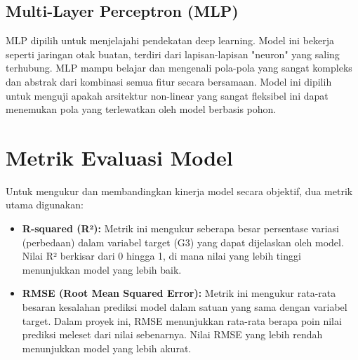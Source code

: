 \subsection{Multi-Layer Perceptron (MLP)}
MLP dipilih untuk menjelajahi pendekatan deep learning. Model ini bekerja seperti jaringan otak buatan, terdiri dari lapisan-lapisan "neuron" yang saling terhubung. MLP mampu belajar dan mengenali pola-pola yang sangat kompleks dan abstrak dari kombinasi semua fitur secara bersamaan. Model ini dipilih untuk menguji apakah arsitektur non-linear yang sangat fleksibel ini dapat menemukan pola yang terlewatkan oleh model berbasis pohon.

\section{Metrik Evaluasi Model}
Untuk mengukur dan membandingkan kinerja model secara objektif, dua metrik utama digunakan:

\begin{itemize}
\item \textbf{R-squared (R²):} Metrik ini mengukur seberapa besar persentase variasi (perbedaan) dalam variabel target (G3) yang dapat dijelaskan oleh model. Nilai R² berkisar dari 0 hingga 1, di mana nilai yang lebih tinggi menunjukkan model yang lebih baik.
\item \textbf{RMSE (Root Mean Squared Error):} Metrik ini mengukur rata-rata besaran kesalahan prediksi model dalam satuan yang sama dengan variabel target. Dalam proyek ini, RMSE menunjukkan rata-rata berapa poin nilai prediksi meleset dari nilai sebenarnya. Nilai RMSE yang lebih rendah menunjukkan model yang lebih akurat.
\end{itemize}
